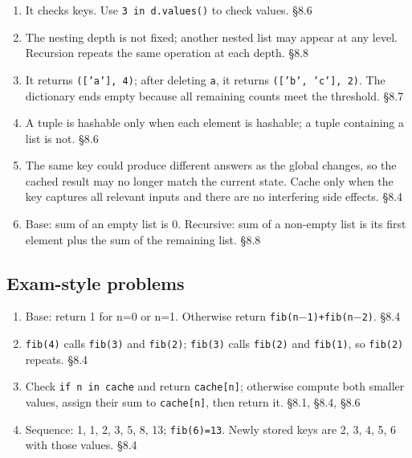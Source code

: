 \documentclass[11pt]{article}
\begin{document}
\begin{keepsection}
\begin{enumerate}
\item It checks keys. Use \texttt{3 in d.values()} to check values. \hfill{\small\color{FAUblue}§8.6}
\item The nesting depth is not fixed; another nested list may appear at any level. Recursion repeats the same operation at each depth. \hfill{\small\color{FAUblue}§8.8}
\item It returns \texttt{(['a'], 4)}; after deleting \texttt{a}, it returns \texttt{(['b', 'c'], 2)}. The dictionary ends empty because all remaining counts meet the threshold. \hfill{\small\color{FAUblue}§8.7}
\item A tuple is hashable only when each element is hashable; a tuple containing a list is not. \hfill{\small\color{FAUblue}§8.6}
\item The same key could produce different answers as the global changes, so the cached result may no longer match the current state. Cache only when the key captures all relevant inputs and there are no interfering side effects. \hfill{\small\color{FAUblue}§8.4}
\item Base: sum of an empty list is 0. Recursive: sum of a non-empty list is its first element plus the sum of the remaining list. \hfill{\small\color{FAUblue}§8.8}
\end{enumerate}

\end{keepsection}
\begin{keepsection}\subsection{Exam-style problems}

\begin{enumerate}
\item Base: return 1 for n=0 or n=1. Otherwise return \texttt{fib(n\ensuremath{-}1)+fib(n\ensuremath{-}2)}. \hfill{\small\color{FAUblue}§8.4}
\item \texttt{fib(4)} calls \texttt{fib(3)} and \texttt{fib(2)}; \texttt{fib(3)} calls \texttt{fib(2)} and \texttt{fib(1)}, so \texttt{fib(2)} repeats. \hfill{\small\color{FAUblue}§8.4}
\item Check \texttt{if n in cache} and return \texttt{cache[n]}; otherwise compute both smaller values, assign their sum to \texttt{cache[n]}, then return it. \hfill{\small\color{FAUblue}§8.1, §8.4, §8.6}
\item Sequence: 1, 1, 2, 3, 5, 8, 13; \texttt{fib(6)=13}. Newly stored keys are 2, 3, 4, 5, 6 with those values. \hfill{\small\color{FAUblue}§8.4}
\end{enumerate}

\end{keepsection}
\end{document}
